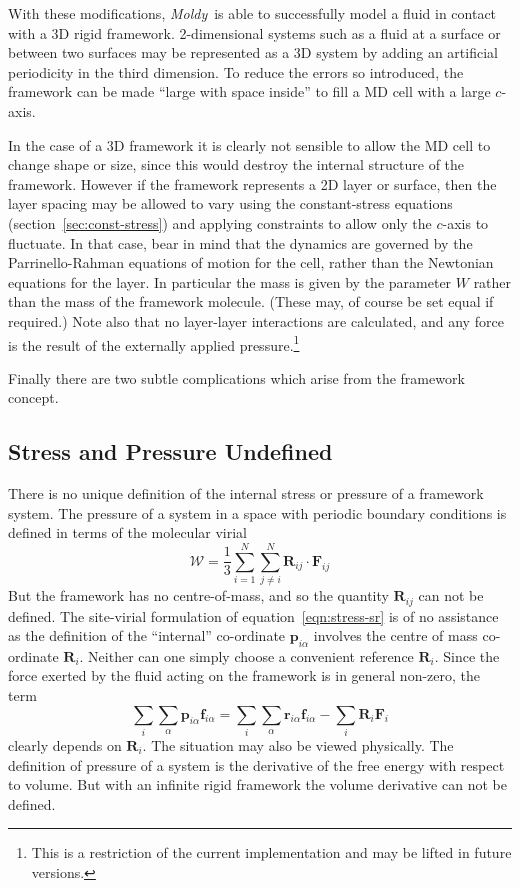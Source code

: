 \documentclass[a4paper,twoside]{report}
\newcommand{\bm}[1]{\mathbf{#1}}
\newcommand{\moldy}{\emph{Moldy}}
\begin{document}
With these modifications, \moldy\ is able to successfully model a fluid
in contact with a 3D rigid framework. 2-dimensional systems such as a
fluid at a surface or between two surfaces may be represented as a 3D
system by adding an artificial periodicity in the third dimension. To
reduce the errors so introduced, the framework can be made ``large
with space inside'' to fill a MD cell with a large $c$-axis.  

In the case of a 3D framework it is clearly not sensible to allow the
MD cell to change shape or size, since this would destroy the internal
structure of the framework.  However if the framework represents a 2D
layer or surface, then the layer spacing may be allowed to vary using
the constant-stress equations (section~\ref{sec:const-stress}) and
applying constraints to allow only the $c$-axis to fluctuate.  In that
case, bear in mind that the dynamics are governed by the
Parrinello-Rahman equations of motion for the cell, rather than the
Newtonian equations for the layer.  In particular the mass is given by
the parameter $W$ rather than the mass of the framework molecule.
(These may, of course be set equal if required.)  Note also that no
layer-layer interactions are calculated, and any force is the result
of the externally applied pressure.\footnote{This is a restriction of
  the current implementation and may be lifted in future versions.}

Finally there are two subtle complications which arise from the
framework concept.

\subsection{Stress and Pressure Undefined}
There is no unique definition of the internal stress or pressure of a
framework system.    The pressure of a system in a space with periodic
boundary conditions  is defined in terms of the molecular virial
\begin{equation}
\label{eqn:virial}
{\mathcal W} = \frac{1}{3} \sum_{i=1}^N \sum_{j \neq i}^N \bm{R}_{ij}
\cdot \bm{F}_{ij}
\end{equation}
But the framework has no centre-of-mass, and so the quantity
$\bm{R}_{ij}$ can not be defined.  The site-virial formulation of
equation~\ref{eqn:stress-sr} is of no assistance as the definition of the
``internal'' co-ordinate $\bm{p}_{i\alpha}$ involves the centre of
mass co-ordinate $\bm{R}_i$.  Neither can one simply choose a
convenient reference $\bm{R}_i$.  Since the force exerted by the fluid
acting on the framework is in general non-zero, the term
\begin{equation}
\sum_i \sum_\alpha \bm{p}_{i\alpha} \bm{f}_{i\alpha}
= \sum_i \sum_\alpha \bm{r}_{i\alpha} \bm{f}_{i\alpha}
- \sum_i \bm{R}_i \bm{F}_i
\end{equation}
clearly depends on $\bm{R}_i$.  The situation may also be viewed
physically.  The definition of pressure of a system is the derivative
of the free energy with respect to volume.  But with an infinite rigid
framework the volume derivative can not be defined.
\end{document}

